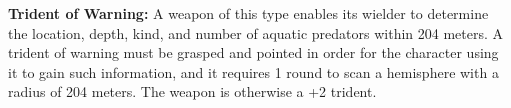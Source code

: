 
% 
\textbf{Trident of Warning:} A weapon of this type enables its wielder to determine the location, depth, kind, and number of aquatic predators within 204 meters. A trident of warning must be grasped and pointed in order for the character using it to gain such information, and it requires 1 round to scan a hemisphere with a radius of 204 meters. The weapon is otherwise a +2 trident.

